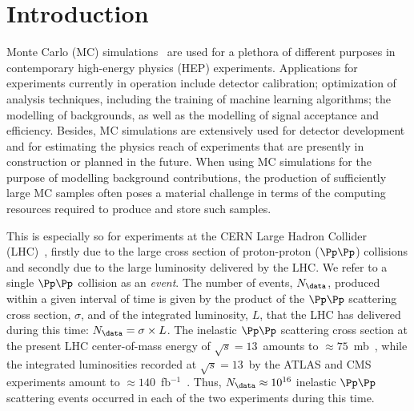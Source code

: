 \section{Introduction}
\label{sec:introduction}

Monte Carlo (MC) simulations~\cite{Kroese2014WhyTM,dunn2011exploring} are used for a plethora of different purposes in contemporary high-energy physics (HEP) experiments.
Applications for experiments currently in operation include detector calibration; optimization of analysis techniques, including the training of machine learning algorithms;
the modelling of backgrounds, as well as the modelling of signal acceptance and efficiency.
Besides, MC simulations are extensively used for detector development and for estimating the physics reach of experiments that are presently in construction or planned in the future.
When using MC simulations for the purpose of modelling background contributions,
the production of sufficiently large MC samples often poses a material challenge in terms of the computing resources required to produce and store such samples.

This is especially so for experiments at the CERN Large Hadron Collider (LHC)~\cite{Bruning:2004ej,Buning:2004wk,Benedikt:2004wm},
firstly due to the large cross section of proton-proton ($\Pp\Pp$) collisions and secondly due to the large luminosity delivered by the LHC.
We refer to a single $\Pp\Pp$ collision as an {\em event}.
The number of events, $N_{\data}$, produced within a given interval of time 
is given by the product of the $\Pp\Pp$ scattering cross section, $\sigma$, and of the integrated luminosity, $L$, that the LHC has delivered during this time:
$N_{\data} = \sigma \times L$.
The inelastic $\Pp\Pp$ scattering cross section at the present LHC center-of-mass energy of $\sqrt{s}=13$~\TeV amounts to $\approx 75$~mb~\cite{Aaboud:2016mmw,Sirunyan:2018nqx},
while the integrated luminosities recorded at $\sqrt{s}=13$~\TeV by the ATLAS and CMS experiments amount to $\approx 140$~fb$^{-1}$~\cite{ATLAS-CONF-2019-021,LUM-17-001,LUM-17-004,LUM-18-002}.
Thus, $N_{\data} \approx 10^{16}$ inelastic $\Pp\Pp$ scattering events occurred in each of the two experiments during this time.

